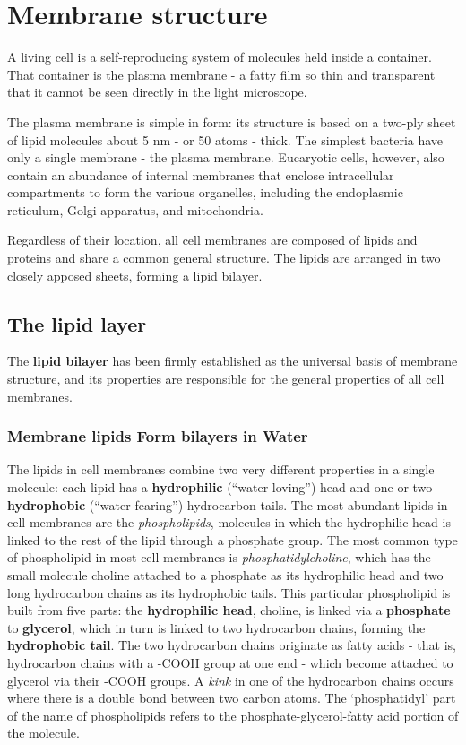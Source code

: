 \chapter{Membrane structure}

A living cell is a self-reproducing system of molecules held inside a container.
That container is the plasma membrane - a fatty film so thin and
transparent that it cannot be seen directly in the light microscope.

The plasma membrane is simple in form: its structure is based on a two-ply
sheet of lipid molecules about 5 nm - or 50 atoms - thick.
The simplest bacteria have only a single membrane - the plasma membrane.
Eucaryotic cells, however, also contain an abundance of internal
membranes that enclose intracellular compartments to form the various
organelles, including the endoplasmic reticulum, Golgi apparatus, and
mitochondria.

Regardless of their location, all cell membranes are composed of lipids
and proteins and share a common general structure. The
lipids are arranged in two closely apposed sheets, forming a lipid bilayer.

\section{The lipid layer}

The \textbf{lipid bilayer} has been firmly established as the universal basis of
membrane structure, and its properties are responsible for the general
properties of all cell membranes.

\subsection{Membrane lipids Form bilayers in Water}

The lipids in cell membranes combine two very different properties in a
single molecule: each lipid has a \textbf{hydrophilic} (“water-loving”) head and
one or two \textbf{hydrophobic} (“water-fearing”) hydrocarbon tails.
The most abundant lipids in cell membranes are the \textit{phospholipids},
molecules in which the hydrophilic head is linked to the rest of the lipid
through a phosphate group. The most common type of phospholipid
in most cell membranes is \textit{phosphatidylcholine}, which has the small
molecule choline attached to a phosphate as its hydrophilic head and two
long hydrocarbon chains as its hydrophobic tails.
This particular phospholipid is built from five parts: the \textbf{hydrophilic head},
choline, is linked via a \textbf{phosphate} to \textbf{glycerol}, which in turn is linked to two
hydrocarbon chains, forming the \textbf{hydrophobic tail}. The two hydrocarbon chains originate
as fatty acids - that is, hydrocarbon chains with a -COOH group at one end - which become
attached to glycerol via their -COOH groups. A \textit{kink} in one of the hydrocarbon chains
occurs where there is a double bond between two carbon atoms. The ‘phosphatidyl’ part of the 
name of phospholipids refers to the phosphate-glycerol-fatty acid portion of the molecule.

